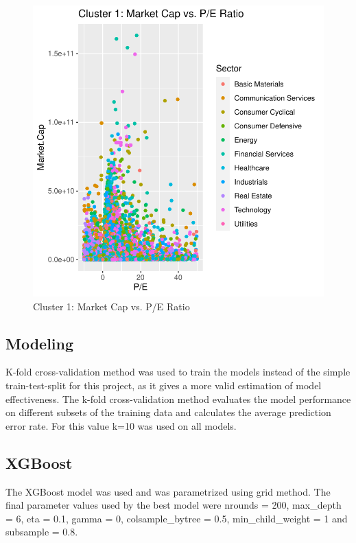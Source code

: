 \documentclass[11pt,]{article}
\begin{document}
\begin{figure}

{\centering \includegraphics{stock_analysis_files/figure-latex/pe ratio clust1-1} 

}

\caption{Cluster 1: Market Cap vs. P/E Ratio}\label{fig:pe ratio clust1}
\end{figure}

\hypertarget{modeling}{%
\subsection{Modeling}\label{modeling}}

K-fold cross-validation method was used to train the models instead of
the simple train-test-split for this project, as it gives a more valid
estimation of model effectiveness. The k-fold cross-validation method
evaluates the model performance on different subsets of the training
data and calculates the average prediction error rate. For this value
k=10 was used on all models.

\hypertarget{xgboost}{%
\subsection{XGBoost}\label{xgboost}}

The XGBoost model was used and was parametrized using grid method. The
final parameter values used by the best model were nrounds = 200,
max\_depth = 6, eta = 0.1, gamma = 0, colsample\_bytree = 0.5,
min\_child\_weight = 1 and subsample = 0.8.
\end{document}
